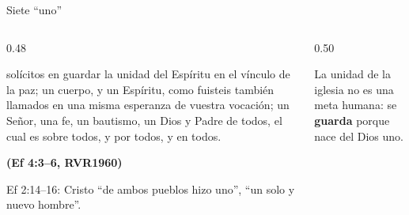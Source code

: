 \documentclass[hyperref={bookmarks=false},aspectratio=169]{beamer}
\newcommand{\fuente}[1]{\par\hfill{\upshape\bfseries\footnotesize\textcolor{azul}{#1}}}
\newcommand{\destacar}[1]{\textbf{\textcolor{azul}{#1}}}
\begin{document}
\begin{frame}{Siete ``uno''}
\begin{columns}[c,onlytextwidth]
\begin{column}{0.48\textwidth}
\begin{cita}[fontupper=\scriptsize\itshape]solícitos en guardar la unidad del Espíritu en el vínculo de la paz; un cuerpo, y un Espíritu, como fuisteis también llamados en una misma esperanza de vuestra vocación; un Señor, una fe, un bautismo, un Dios y Padre de todos, el cual es sobre todos, y por todos, y en todos.\fuente{(Ef 4:3--6, RVR1960)}\end{cita}
\scriptsize Ef 2:14--16: Cristo ``de ambos pueblos hizo uno'', ``un solo y nuevo hombre''.
\end{column}
\begin{column}{0.50\textwidth}
\centering
{}\par\smallskip
\small La unidad de la iglesia no es una meta humana: se \destacar{guarda} porque nace del Dios uno.
\end{column}
\end{columns}
\end{frame}
\end{document}
